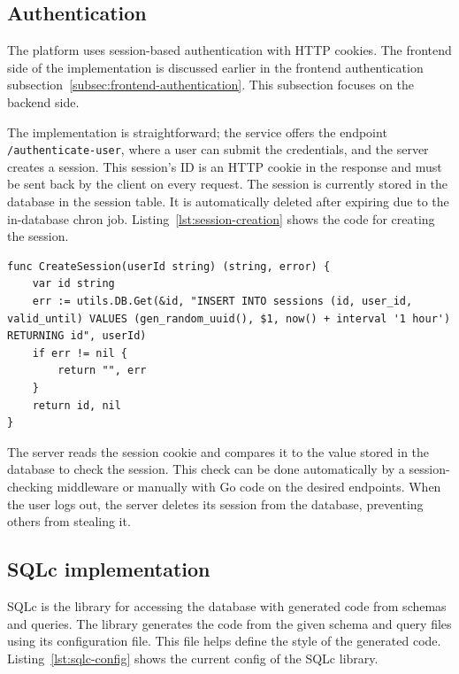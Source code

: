 \subsection{Authentication}

The platform uses session-based authentication with HTTP cookies. The frontend side of the implementation is discussed earlier in the frontend authentication subsection~\ref{subsec:frontend-authentication}. This subsection focuses on the backend side.

The implementation is straightforward; the service offers the endpoint \texttt{/authenticate-user}, where a user can submit the credentials, and the server creates a session. This session's ID is an HTTP cookie in the response and must be sent back by the client on every request. The session is currently stored in the database in the session table. It is automatically deleted after expiring due to the in-database chron job. Listing~\ref{lst:session-creation} shows the code for creating the session.

\begin{lstlisting}[caption=Session creation code,label=lst:session-creation]
func CreateSession(userId string) (string, error) {
	var id string
	err := utils.DB.Get(&id, "INSERT INTO sessions (id, user_id, valid_until) VALUES (gen_random_uuid(), $1, now() + interval '1 hour') RETURNING id", userId)
	if err != nil {
		return "", err
	}
	return id, nil
}
\end{lstlisting}

The server reads the session cookie and compares it to the value stored in the database to check the session. This check can be done automatically by a session-checking middleware or manually with Go code on the desired endpoints. When the user logs out, the server deletes its session from the database, preventing others from stealing it.

\subsection{SQLc implementation}

SQLc is the library for accessing the database with generated code from schemas and queries. The library generates the code from the given schema and query files using its configuration file. This file helps define the style of the generated code. Listing~\ref{lst:sqlc-config} shows the current config of the SQLc library.

